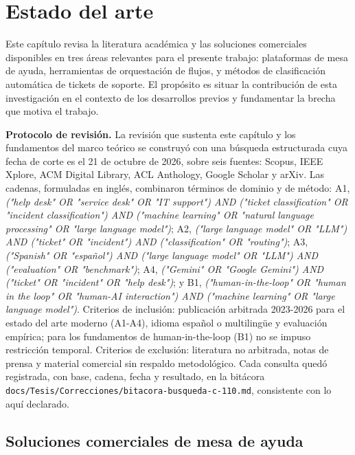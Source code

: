 \section{Estado del arte}\label{sec:estado-del-arte}

Este capítulo revisa la literatura académica y las soluciones comerciales disponibles en tres áreas relevantes para el presente trabajo: plataformas de mesa de ayuda, herramientas de orquestación de flujos, y métodos de clasificación automática de tickets de soporte. El propósito es situar la contribución de esta investigación en el contexto de los desarrollos previos y fundamentar la brecha que motiva el trabajo.

\noindent\textbf{Protocolo de revisión.} La revisión que sustenta este capítulo y los fundamentos del marco teórico se construyó con una búsqueda estructurada cuya fecha de corte es el 21 de octubre de 2026, sobre seis fuentes: Scopus, IEEE Xplore, ACM Digital Library, ACL Anthology, Google Scholar y arXiv. Las cadenas, formuladas en inglés, combinaron términos de dominio y de método: A1, \emph{("help desk" OR "service desk" OR "IT support") AND ("ticket classification" OR "incident classification") AND ("machine learning" OR "natural language processing" OR "large language model")}; A2, \emph{("large language model" OR "LLM") AND ("ticket" OR "incident") AND ("classification" OR "routing")}; A3, \emph{("Spanish" OR "español") AND ("large language model" OR "LLM") AND ("evaluation" OR "benchmark")}; A4, \emph{("Gemini" OR "Google Gemini") AND ("ticket" OR "incident" OR "help desk")}; y B1, \emph{("human-in-the-loop" OR "human in the loop" OR "human-AI interaction") AND ("machine learning" OR "large language model")}. Criterios de inclusión: publicación arbitrada 2023-2026 para el estado del arte moderno (A1-A4), idioma español o multilingüe y evaluación empírica; para los fundamentos de human-in-the-loop (B1) no se impuso restricción temporal. Criterios de exclusión: literatura no arbitrada, notas de prensa y material comercial sin respaldo metodológico. Cada consulta quedó registrada, con base, cadena, fecha y resultado, en la bitácora \texttt{docs/Tesis/Correcciones/bitacora-busqueda-c-110.md}, consistente con lo aquí declarado.

\subsection{Soluciones comerciales de mesa de ayuda}\label{subsec:soluciones-comerciales}

